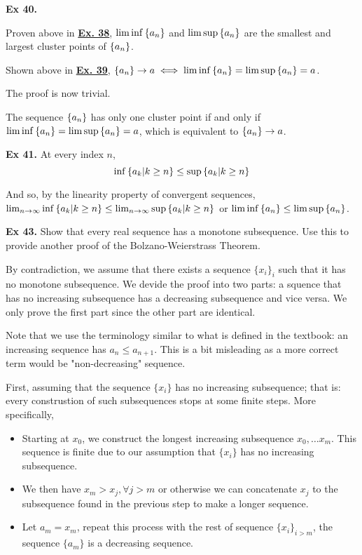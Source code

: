 \noindent {} \textbf{Ex 40.}

Proven above in \underline{\textbf{Ex. 38}}, $\liminf\left\{a_n\right\}$ and $\limsup\left\{a_n\right\}$ are the smallest and largest cluster points of $\left\{a_n\right\}$.

Shown above in \underline{\textbf{Ex. 39}}, $\left\{a_n\right\}\to a \iff \liminf\left\{a_n\right\} = \limsup\left\{a_n\right\} = a$.

The proof is now trivial.

The sequence $\left\{a_n\right\}$ has only one cluster point if and only if $\liminf\left\{a_n\right\} = \limsup\left\{a_n\right\} = a$, which is equivalent to $\left\{a_n\right\} \to a$.

\noindent {} \textbf{Ex 41.} \label{ex:1_41}
At every index $n$,
\[ \inf\left\{a_k | k \geq n\right\} \leq \sup\left\{a_k | k \geq n\right\} \]

And so, by the linearity property of convergent sequences, $\lim_{n\to\infty}\inf\left\{a_k | k \geq n\right\} \leq \lim_{n\to\infty}\sup\left\{a_k | k \geq n\right\}$ or $\liminf\left\{a_n\right\} \leq \limsup\left\{a_n\right\}$.

\noindent {} \textbf{Ex 43.} \label{ex:43} Show that every real sequence has a monotone subsequence. Use this to provide another proof of the Bolzano-Weierstrass Theorem. 

By contradiction, we assume that there exists a sequence $\{x_i\}_i$ such that it has no monotone subsequence. We devide the proof into two parts: a squence that has no increasing subsequence has a decreasing subsequence and vice versa. We only prove the first part since the other part are identical.

Note that we use the terminology similar to what is defined in the textbook: an increasing sequence has $a_n \leq a_{n+1}$. This is a bit misleading as a more correct term would be "non-decreasing" sequence. 

First, assuming that the sequence $\{x_i\}$ has no increasing subsequence; that is: every construstion of such subsequences stops at some finite steps. More specifically, 

\begin{itemize}
    \item Starting at $x_0$, we construct the longest increasing subsequence ${x_0, \dots x_m}$. This sequence is finite due to our assumption that $\{x_i\}$ has no increasing subsequence. 
    \item We then have $x_m>x_j, \forall j > m$ or otherwise we can concatenate $x_j$ to the subsequence found in the previous step to make a longer sequence.
    \item Let $a_m = x_m$, repeat this process with the rest of sequence $\{x_i\}_{i>m}$, the sequence $\{a_m\}$ is a decreasing sequence. 
\end{itemize}

